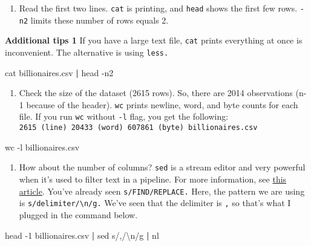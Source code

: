 \documentclass[
]{book}
\newenvironment{Shaded}{\begin{snugshade}}{\end{snugshade}}
\newcommand{\FunctionTok}[1]{\textcolor[rgb]{0.00,0.00,0.00}{#1}}
\newcommand{\KeywordTok}[1]{\textcolor[rgb]{0.13,0.29,0.53}{\textbf{#1}}}
\newcommand{\NormalTok}[1]{#1}
\newcommand{\StringTok}[1]{\textcolor[rgb]{0.31,0.60,0.02}{#1}}
\providecommand{\tightlist}{%
  \setlength{\itemsep}{0pt}\setlength{\parskip}{0pt}}
\begin{document}
\begin{enumerate}
\def\labelenumi{\arabic{enumi}.}
\setcounter{enumi}{1}
\tightlist
\item
  Read the first two lines. \texttt{cat} is printing, and \texttt{head} shows the first few rows. \texttt{-n2} limits these number of rows equals 2.
\end{enumerate}

\textbf{Additional tips 1}
If you have a large text file, \texttt{cat} prints everything at once is inconvenient. The alternative is using \texttt{less.}

\begin{Shaded}
\begin{Highlighting}[]
\FunctionTok{cat}\NormalTok{ billionaires.csv }\KeywordTok{|} \FunctionTok{head}\NormalTok{ {-}n2}
\end{Highlighting}
\end{Shaded}

\begin{enumerate}
\def\labelenumi{\arabic{enumi}.}
\setcounter{enumi}{2}
\tightlist
\item
  Check the size of the dataset (2615 rows). So, there are 2014 observations (n-1 because of the header). \texttt{wc} prints newline, word, and byte counts for each file. If you run \texttt{wc} without \texttt{-l} flag, you get the following: \texttt{2615\ (line)\ 20433\ (word)\ 607861\ (byte)\ billionaires.csv}
\end{enumerate}

\begin{Shaded}
\begin{Highlighting}[]
\FunctionTok{wc}\NormalTok{ {-}l billionaires.csv}
\end{Highlighting}
\end{Shaded}

\begin{enumerate}
\def\labelenumi{\arabic{enumi}.}
\setcounter{enumi}{3}
\tightlist
\item
  How about the number of columns? \texttt{sed} is a stream editor and very powerful when it's used to filter text in a pipeline. For more information, see \href{https://www.gnu.org/software/sed/manual/sed.html}{this article}. You've already seen \texttt{s/FIND/REPLACE.} Here, the pattern we are using is \texttt{s/delimiter/\textbackslash{}n/g.} We've seen that the delimiter is \texttt{,} so that's what I plugged in the command below.
\end{enumerate}

\begin{Shaded}
\begin{Highlighting}[]
\FunctionTok{head}\NormalTok{ {-}1 billionaires.csv }\KeywordTok{|} \FunctionTok{sed} \StringTok{\textquotesingle{}s/,/\textbackslash{}n/g\textquotesingle{}} \KeywordTok{|} \FunctionTok{nl}
\end{Highlighting}
\end{Shaded}
\end{document}
